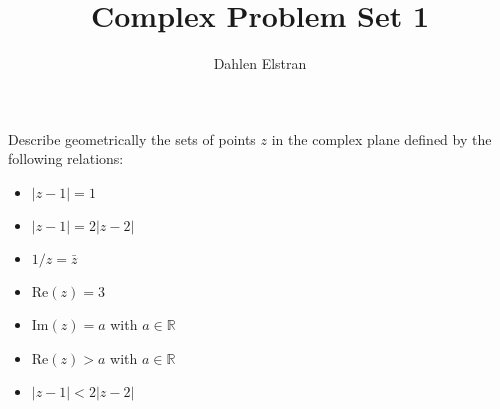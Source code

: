 \documentclass[12pt]{article}
\newenvironment{statement}[2][Statement]{\begin{trivlist}
\item[\hskip \labelsep {\bfseries #1}\hskip \labelsep {\bfseries #2.}]}{\end{trivlist}}
\begin{document}
 
\title{Complex Problem Set 1} 
\author{Dahlen Elstran} 
\maketitle

\begin{statement}[Problem]{1}
  Describe geometrically the sets of points $z$ in the complex plane defined by the 
  following relations:
  \begin{itemize}
    \item[(a)] $| z - 1 |=1$
    \item[(b)] $| z - 1 | = 2 | z - 2|$
    \item[(c)]$1 / z = \bar{z}$
    \item[(d)]$\text{Re}(z) = 3$ 
    \item[(e)] $\text{Im}(z) = a$ with $a \in \mathbb{R}$ 
    \item[(f)] $\text{Re}(z) > a$ with $a \in \mathbb{R}$ 
    \item[(g)] $| z - 1| < 2|z - 2|$
  \end{itemize}
\end{statement}
\end{document}
